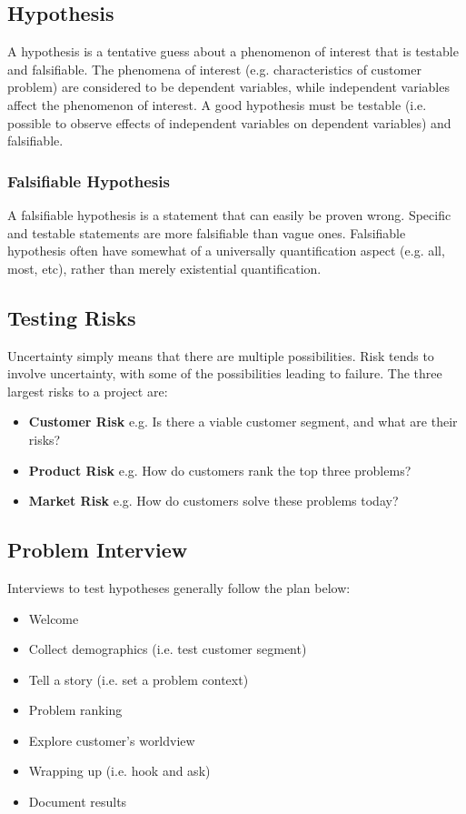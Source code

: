 \documentclass[12pt,titlepage]{article}
\begin{document}
    \subsection{Hypothesis}
      A hypothesis is a tentative guess about a phenomenon of interest that is testable and falsifiable. The phenomena of interest
      (e.g. characteristics of customer problem) are considered to be dependent variables, while independent variables affect the
      phenomenon of interest. A good hypothesis must be testable (i.e. possible to observe effects of independent variables on
      dependent variables) and falsifiable.

      \subsubsection{Falsifiable Hypothesis}
        A falsifiable hypothesis is a statement that can easily be proven wrong. Specific and testable statements are more falsifiable
        than vague ones. Falsifiable hypothesis often have somewhat of a universally quantification aspect (e.g. all, most, etc), rather
        than merely existential quantification.

    \subsection{Testing Risks}
      Uncertainty simply means that there are multiple possibilities. Risk tends to involve uncertainty, with some of the possibilities
      leading to failure. The three largest risks to a project are:
      \begin{itemize}
        \item \textbf{Customer Risk} e.g. Is there a viable customer segment, and what are their risks?
        \item \textbf{Product Risk} e.g. How do customers rank the top three problems?
        \item \textbf{Market Risk} e.g. How do customers solve these problems today?
      \end{itemize}

    \subsection{Problem Interview}
      Interviews to test hypotheses generally follow the plan below:
      \begin{itemize}
        \item Welcome
        \item Collect demographics (i.e. test customer segment)
        \item Tell a story (i.e. set a problem context)
        \item Problem ranking
        \item Explore customer's worldview
        \item Wrapping up (i.e. hook and ask)
        \item Document results
      \end{itemize}
\end{document}
